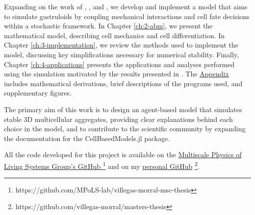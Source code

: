 Expanding on the work of \cite{Liedekerke_2015}, \cite{Saiz_2020}, and \cite{Torregrosa_2023}, we develop and implement a model that aims to si\-mu\-late gastruloids by coupling mechanical interactions and cell fate decisions within a stochastic framework. In Chapter \ref{ch:2-abm}, we present the mathematical model, describing cell mechanics and cell differentiation. In Chapter \ref{ch:3-implementation}, we review the methods used to implement the model, discussing key simplifications necessary for numerical stability. Finally, Chapter \ref{ch:4-applications} presents the applications and analyses performed using the simulation motivated by the results presented in \cite{Oriola_2025}. The \hyperref[ch:appendix]{Appendix} includes mathematical derivations, brief descriptions of the programs used, and supplementary figures.

The primary aim of this work is to design an agent-based model that simulates stable 3D multicellular aggregates, providing clear explanations behind each choice in the model, and to contribute to the scientific community by expanding the documentation for the CellBasedModels.jl package.

All the code developed for this project is available on the \href{https://github.com/MPoLS-lab/villegas-morral-msc-thesis}{Multiscale Physics of Living Systems Group's GitHub \footnote{https://github.com/MPoLS-lab/villegas-morral-msc-thesis}} and on my \href{https://github.com/villegas-morral/masters-thesis}{personal GitHub} \footnote{https://github.com/villegas-morral/masters-thesis}.